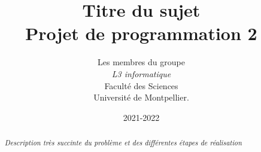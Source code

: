 \documentclass[a4paper]{article}
\title{  Titre du sujet\\         %
  Projet de programmation 2}
\author{ Les membres du groupe\\
  \emph{L3 informatique}\\
  Faculté des Sciences\\
Université de Montpellier.}
\date{2021-2022}
\begin{document}
\maketitle                    %


\begin{abstract}     %

  \emph{Description très succinte du problème et des différentes étapes de réalisation}

\end{abstract}
\newpage
\tableofcontents
\newpage
\end{document}
